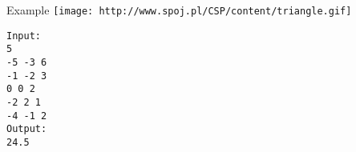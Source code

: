 Example
\texttt{[image: http://www.spoj.pl/CSP/content/triangle.gif]}
\begin{verbatim}
Input:
5
-5 -3 6
-1 -2 3
0 0 2
-2 2 1
-4 -1 2
Output:
24.5
\end{verbatim}